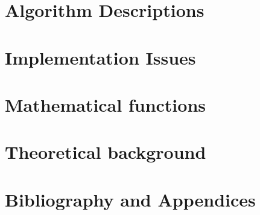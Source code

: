 %
\newpage
\thispagestyle{empty}
\rule{0pt}{10pt}
\newpage

\tableofcontents

\cleardoublepage
{}
     

%
%



%
\part{Algorithm Descriptions}


%



%
%
%
% 
\part{Implementation Issues}


\part{Mathematical functions}



\part{Theoretical background}



%
%


%
\part{Bibliography and Appendices}
%

%
%
\begin{appendix}





%  
%  

\end{appendix}


%
%
\printindex






